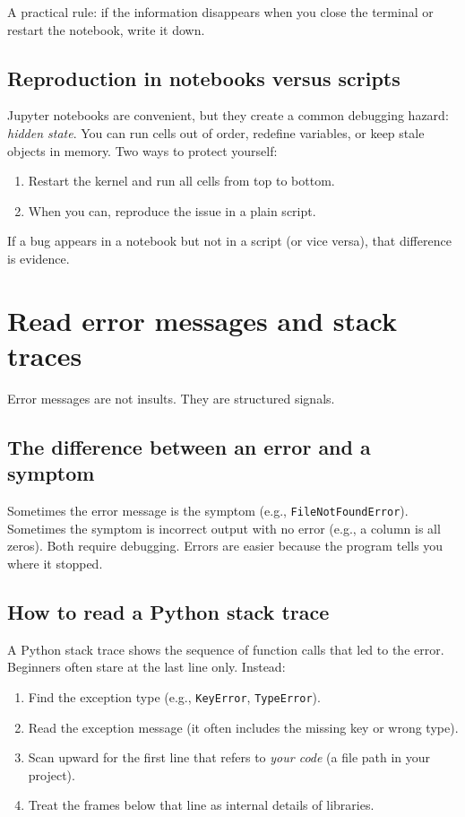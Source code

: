 A practical rule: if the information disappears when you close the terminal or restart the notebook, write it down.

\subsection{Reproduction in notebooks versus scripts}
Jupyter notebooks are convenient, but they create a common debugging hazard: \emph{hidden state}. You can run cells out of order, redefine variables, or keep stale objects in memory. Two ways to protect yourself:
\begin{enumerate}[noitemsep]
  \item Restart the kernel and run all cells from top to bottom.
  \item When you can, reproduce the issue in a plain script.
\end{enumerate}

If a bug appears in a notebook but not in a script (or vice versa), that difference is evidence.

\section{Read error messages and stack traces}
Error messages are not insults. They are structured signals.

\subsection{The difference between an error and a symptom}
Sometimes the error message is the symptom (e.g., \texttt{FileNotFoundError}). Sometimes the symptom is incorrect output with no error (e.g., a column is all zeros). Both require debugging. Errors are easier because the program tells you where it stopped.

\subsection{How to read a Python stack trace}
A Python stack trace shows the sequence of function calls that led to the error. Beginners often stare at the last line only. Instead:
\begin{enumerate}[noitemsep]
  \item Find the exception type (e.g., \texttt{KeyError}, \texttt{TypeError}).
  \item Read the exception message (it often includes the missing key or wrong type).
  \item Scan upward for the first line that refers to \emph{your code} (a file path in your project).
  \item Treat the frames below that line as internal details of libraries.
\end{enumerate}

